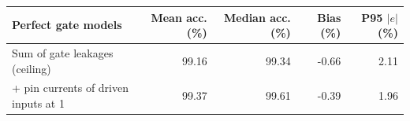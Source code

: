 \begin{tabular}{lrrrr}
\toprule
Perfect gate models & Mean acc. (\%) & Median acc. (\%) & Bias (\%) & P95 $|e|$ (\%) \\
\midrule
Sum of gate leakages (ceiling) & 99.16 & 99.34 & -0.66 & 2.11 \\
+ pin currents of driven inputs at 1 & 99.37 & 99.61 & -0.39 & 1.96 \\
\bottomrule
\end{tabular}
